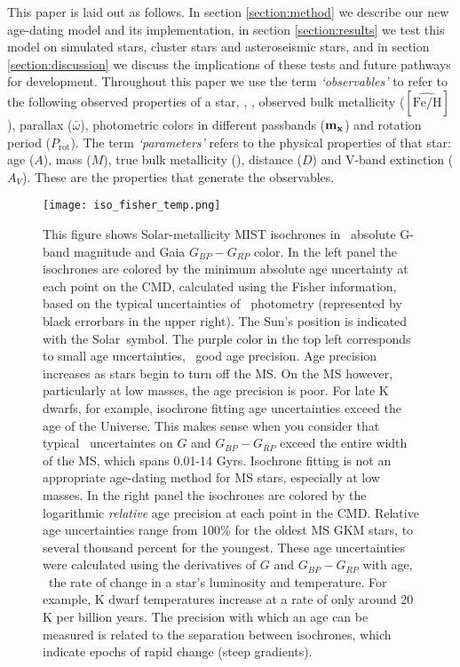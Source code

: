 This paper is laid out as follows.
In section \ref{section:method} we describe our new age-dating model and its
implementation, in section \ref{section:results} we test this model on
simulated stars, cluster stars and asteroseismic stars, and in section
\ref{section:discussion} we discuss the implications of these tests and future
pathways for development.
Throughout this paper we use the term {\it `observables'} to refer to the
following observed properties of a star, \teff, \logg, observed bulk
metallicity ($[\hat{\mathrm{Fe/H}}]$), parallax ($\bar{\omega}$), photometric
colors in different passbands ($\bf{m_x}$) and rotation period
($P_{\mathrm{rot}}$).
The term {\it `parameters'} refers to the physical properties of that star:
age ($A$), mass ($M$), true bulk metallicity (\feh), distance ($D$) and V-band
extinction ($A_V$).
These are the properties that generate the observables.

\begin{figure}
  \caption{
    This figure shows Solar-metallicity MIST isochrones in \Gaia\ absolute
    G-band magnitude and Gaia $G_{BP} - G_{RP}$ color.
    In the left panel the isochrones are colored by the minimum absolute age
    uncertainty at each point on the CMD, calculated using the Fisher
    information, based on the typical uncertainties of \Gaia\ photometry
    (represented by black errorbars in the upper right).
    The Sun's position \citep{casagrande2018} is indicated with the Solar\
    symbol.
    The purple color in the top left corresponds to small age uncertainties,
    \ie\ good age precision.
    Age precision increases as stars begin to turn off the MS.
    On the MS however, particularly at low masses, the age precision is poor.
    For late K dwarfs, for example, isochrone fitting age uncertainties exceed
    the age of the Universe.
    This makes sense when you consider that typical \Gaia\ uncertaintes on $G$
    and $G_{BP} - G_{RP}$ exceed the entire width of the MS, which spans
    0.01-14 Gyrs.
    Isochrone fitting is not an appropriate age-dating method for MS stars,
    especially at low masses.
    In the right panel the isochrones are colored by the logarithmic
    {\it relative} age precision at each point in the CMD.
    Relative age uncertainties range from 100\% for the oldest MS GKM stars,
    to several thousand percent for the youngest.
    These age uncertainties were calculated using the derivatives of $G$ and
    $G_{BP} - G_{RP}$ with age, \ie\ the rate of change in a star's luminosity
    and temperature.
    For example, K dwarf temperatures increase at a rate of only around 20 K
    per billion years.
    The precision with which an age can be measured is related to the
    separation between isochrones, which indicate epochs of rapid change
    (steep gradients).\label{fig:fischer_iso}
}
  \centering
    \texttt{[image: iso\_fisher\_temp.png]}
\label{fig:iso_fisher}
\end{figure}

